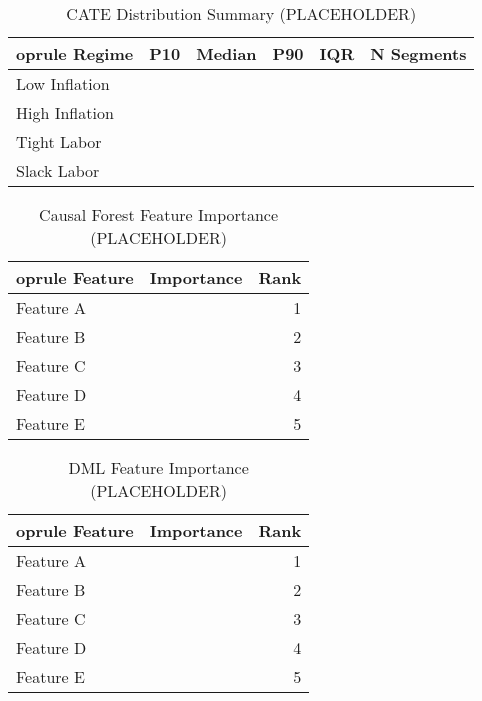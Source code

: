 \begin{table}[H]
  \centering
  \caption{CATE Distribution Summary (PLACEHOLDER)}\label{tab:cate_summary}
  \begin{tabular}{lrrrrr}
    	oprule
    Regime & P10 & Median & P90 & IQR & N Segments \\
    \midrule
  Low Inflation & \textemdash{} & \textemdash{} & \textemdash{} & \textemdash{} & \textemdash{} \\
  High Inflation & \textemdash{} & \textemdash{} & \textemdash{} & \textemdash{} & \textemdash{} \\
  Tight Labor & \textemdash{} & \textemdash{} & \textemdash{} & \textemdash{} & \textemdash{} \\
  Slack Labor & \textemdash{} & \textemdash{} & \textemdash{} & \textemdash{} & \textemdash{} \\
    \bottomrule
  \end{tabular}
\end{table}

\begin{table}[H]
  \centering
  \caption{Causal Forest Feature Importance (PLACEHOLDER)}\label{tab:feature_importance_cf}
  \begin{tabular}{lrr}
    	oprule
    Feature & Importance & Rank \\
    \midrule
  Feature A & \textemdash{} & 1 \\
  Feature B & \textemdash{} & 2 \\
  Feature C & \textemdash{} & 3 \\
  Feature D & \textemdash{} & 4 \\
  Feature E & \textemdash{} & 5 \\
    \bottomrule
  \end{tabular}
\end{table}

\begin{table}[H]
  \centering
  \caption{DML Feature Importance (PLACEHOLDER)}\label{tab:feature_importance_dml}
  \begin{tabular}{lrr}
    	oprule
    Feature & Importance & Rank \\
    \midrule
  Feature A & \textemdash{} & 1 \\
  Feature B & \textemdash{} & 2 \\
  Feature C & \textemdash{} & 3 \\
  Feature D & \textemdash{} & 4 \\
  Feature E & \textemdash{} & 5 \\
    \bottomrule
  \end{tabular}
\end{table}


